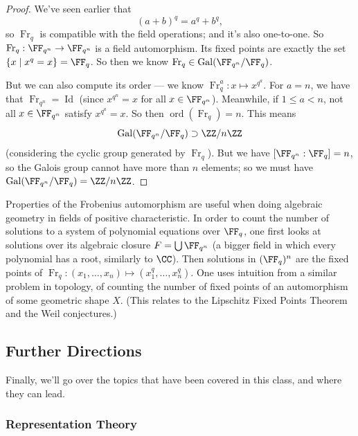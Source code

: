 \begin{proof}
    We've seen earlier that \[(a + b)^q = a^q + b^q,\] so $\operatorname{Fr}_q$ is compatible with the field operations; and it's also one-to-one. So $\operatorname{Fr}_q : \FF_{q^n} \to \FF_{q^n}$ is a field automorphism. Its fixed points are exactly the set $\{x \mid x^q = x\} = \FF_q$. So then we know $\operatorname{Fr}_q \in \operatorname{Gal}(\FF_{q^n}/\FF_q)$. 
    
    But we can also compute its order --- we know $\operatorname{Fr}_q^a : x \mapsto x^{q^a}$. For $a = n$, we have that $\operatorname{Fr}_{q^n} = \operatorname{Id}$ (since $x^{q^n} = x$ for all $x \in \FF_{q^n}$). Meanwhile, if $1 \leq a < n$, not all $x \in \FF_{q^n}$ satisfy $x^{q^a} = x$. So then $\operatorname{ord}(\operatorname{Fr}_q) = n$. This means \[\operatorname{Gal}(\FF_{q^n}/\FF_q) \supset \ZZ/n\ZZ\] (considering the cyclic group generated by $\operatorname{Fr}_q$). But we have $[\FF_{q^n} : \FF_q] = n$, so the Galois group cannot have more than $n$ elements; so we must have $\operatorname{Gal}(\FF_{q^n}/\FF_q) = \ZZ/n\ZZ$. 
\end{proof}

\begin{note}
    Properties of the Frobenius automorphism are useful when doing algebraic geometry in fields of positive characteristic. In order to count the number of solutions to a system of polynomial equations over $\FF_q$, one first looks at solutions over its algebraic closure $F = \bigcup \FF_{q^n}$ (a bigger field in which every polynomial has a root, similarly to $\CC$). Then solutions in $(\FF_q)^n$ are the fixed points of $\operatorname{Fr}_q : (x_1, \ldots, x_n) \mapsto (x_1^q, \ldots, x_n^q)$. 
    One uses intuition from a similar problem in topology, of counting the number of fixed points of an automorphism of some geometric shape $X$. (This relates to the Lipschitz Fixed Points Theorem and the Weil conjectures.)
\end{note}

\subsection{Further Directions}

Finally, we'll go over the topics that have been covered in this class, and where they can lead. 

\subsubsection{Representation Theory}

